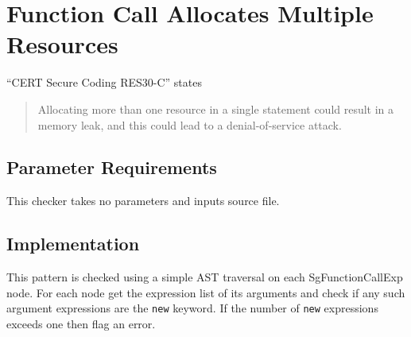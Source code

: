 %
%

\section{Function Call Allocates Multiple Resources}
\label{FunctionCallAllocatesMultipleResources::overview}
``CERT Secure Coding RES30-C'' states
\begin{quote}
Allocating more than one resource in a single statement could result in a memory leak, and this could lead to a denial-of-service attack.
\end{quote}

\subsection{Parameter Requirements}
This checker takes no parameters and inputs source file.

\subsection{Implementation}
This pattern is checked using a simple AST traversal on each SgFunctionCallExp node. For each node get the expression list of its arguments and check if any such argument expressions are the {\tt new} keyword. If the number of {\tt new} expressions exceeds one then flag an error.


